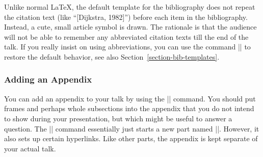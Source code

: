 Unlike normal \LaTeX, the default template for the
bibliography does not repeat the citation text (like ``[Dijkstra,
1982]'') before each item in the bibliography. Instead, a cute, small
article symbol is drawn. The rationale is that the audience will not be
able to remember any abbreviated citation texts till the end of the
talk. If you really insist on using abbreviations, you can use the
command |\beamertemplatetextbibitems| to restore the default
behavior, see also Section~\ref{section-bib-templates}.




\subsubsection{Adding an Appendix}

You can add an appendix to your talk by using the |\appendix|
command. You should put frames and perhaps whole subsections into the
appendix that you do not intend to show during your presentation, but
which might be useful to answer a question. The |\appendix| command
essentially just starts a new part named |\appendixname|. However, it
also sets up certain hyperlinks. 
Like other parts, the appendix is kept separate of your actual
talk.

